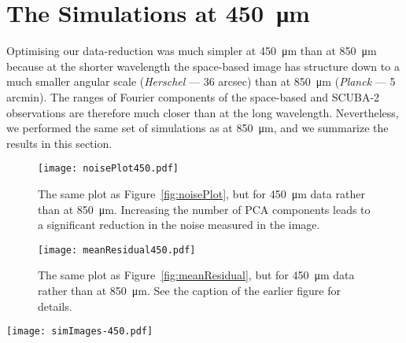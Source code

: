 \documentclass[a4paper,fleqn,usenatbib, twocolumn]{aastex63}
\begin{document}
\section{The Simulations at \SI{450}{\micro\meter}}
\label{sec:450sim}

Optimising our data-reduction was much simpler at \SI{450}{\micro\meter} than at \SI{850}{\micro\meter}
because at the shorter wavelength the space-based image
has structure down to a much smaller angular scale ({\it Herschel} --- 36 arcsec) than
at \SI{850}{\micro\meter} ({\it Planck} --- 5 arcmin). The ranges of Fourier components
of the space-based and SCUBA-2 observations are therefore much closer than at the
long wavelength. Nevertheless, we performed the same set of simulations as
at \SI{850}{\micro\meter}, and we summarize the results in this section.



\begin{figure}
  \centering
  \texttt{[image: noisePlot450.pdf]}
  \caption{The same plot as Figure~\ref{fig:noisePlot}, but for \SI{450}{\micro\meter}
  data rather than at \SI{850}{\micro\meter}. Increasing the number of PCA components 
  leads to a significant reduction in the noise measured in the image.
  }
  \label{fig:noisePlot450}
\end{figure}

\begin{figure}
  \centering
  \texttt{[image: meanResidual450.pdf]}
  \caption{The same plot as Figure~\ref{fig:meanResidual}, but for \SI{450}{\micro\meter}
  data rather than at \SI{850}{\micro\meter}. See the caption of the earlier
  figure for details.
  }
  \label{fig:meanResidual450}
\end{figure}


\begin{figure*}
  \centering
  \texttt{[image: simImages-450.pdf]}
  \caption{As for Figure~\ref{fig:simImages}, but for the \SI{450}{\micro\meter} simulations.}
  \label{fig:simImages450}
\end{figure*}
\end{document}
